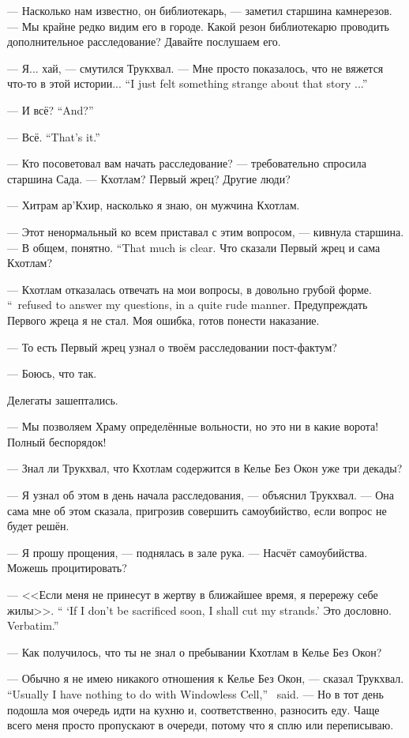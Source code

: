 --- Насколько нам известно, он библиотекарь, --- заметил старшина камнерезов.
--- Мы крайне редко видим его в городе.
Какой резон библиотекарю проводить дополнительное расследование?
Давайте послушаем его.

--- Я... хай, --- смутился Трукхвал.
{--- Мне просто показалось, что не вяжется что-то в этой истории...}
{``I just felt something strange about that story ...''}

{--- И всё?}
{``And?''}

{--- Всё.}
{``That's it.''}

--- Кто посоветовал вам начать расследование? --- требовательно спросила старшина Сада.
--- Кхотлам?
Первый жрец?
Другие люди?

--- Хитрам ар'Кхир, насколько я знаю, он мужчина Кхотлам.

--- Этот ненормальный ко всем приставал с этим вопросом, --- кивнула старшина.
{--- В общем, понятно.}
{``That much is clear.}
Что сказали Первый жрец и сама Кхотлам?

{--- Кхотлам отказалась отвечать на мои вопросы, в довольно грубой форме.}
{``\Kchotlam\ refused to answer my questions, in a quite rude manner.}
Предупреждать Первого жреца я не стал.
Моя ошибка, готов понести наказание.

--- То есть Первый жрец узнал о твоём расследовании пост-фактум?

--- Боюсь, что так.

Делегаты зашептались.

--- Мы позволяем Храму определённые вольности, но это ни в какие ворота!
Полный беспорядок!

--- Знал ли Трукхвал, что Кхотлам содержится в Келье Без Окон уже три декады?

--- Я узнал об этом в день начала расследования, --- объяснил Трукхвал.
--- Она сама мне об этом сказала, пригрозив совершить самоубийство, если вопрос не будет решён.

--- Я прошу прощения, --- поднялась в зале рука.
--- Насчёт самоубийства.
Можешь процитировать?

{--- <<Если меня не принесут в жертву в ближайшее время, я перережу себе жилы>>.}
{`` `If I don't be sacrificed soon, I shall cut my strands.'}
{Это дословно.}
{Verbatim.''}

--- Как получилось, что ты не знал о пребывании Кхотлам в Келье Без Окон?

{--- Обычно я не имею никакого отношения к Келье Без Окон, --- сказал Трукхвал.}
{``Usually I have nothing to do with Windowless Cell,'' \Trukchual\ said.}
--- Но в тот день подошла моя очередь идти на кухню и, соответственно, разносить еду.
Чаще всего меня просто пропускают в очереди, потому что я сплю или переписываю.


